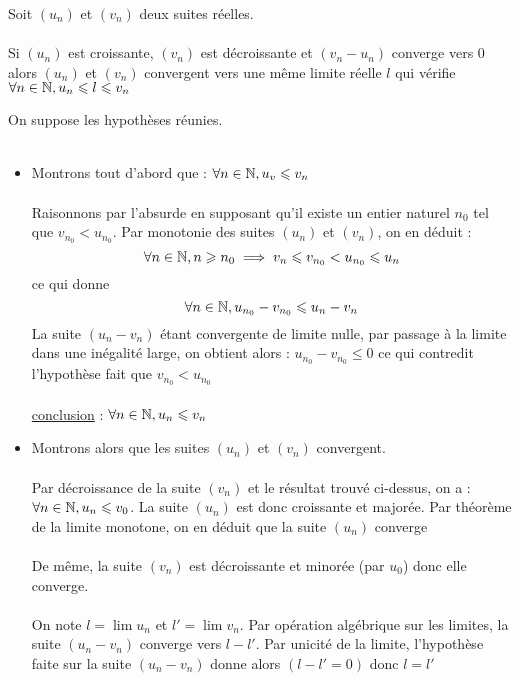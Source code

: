 \begin{theo}
    Soit \((u_n)\) et \((v_n)\) deux suites réelles.\\~\\
    Si \((u_n)\) est croissante, \((v_n)\) est décroissante et \((v_n -u_n)\) converge vers \(0\) alors \((u_n)\) et \((v_n)\) convergent vers une même limite réelle \(l\) qui vérifie \(\forall n \in \mathbb{N}, u_n \leqslant l \leqslant v_n\)
\end{theo}
\begin{dem}
    On suppose les hypothèses réunies.\\~\\
    \begin{itemize}
        \item Montrons tout d'abord que  : \(\forall n \in \mathbb{N}, u_v \leqslant v_n\)\\~\\
        Raisonnons par l'absurde en supposant qu'il existe un entier naturel \(n_0\) tel que \(v_{n_0} < u_{n_0}\). Par monotonie des suites \((u_n)\) et \((v_n)\), on en déduit : 
        \[\forall n \in \mathbb{N}, n \geqslant n_0 \implies v_n \leqslant v_{n_0} < u_{n_0}\leqslant u_n\]
        ce qui donne 
        \[\forall n \in \mathbb{N},u_{n_0}-v_{n_0}\leqslant u_n -v_n\]
        La suite \((u_n - v_n)\) étant convergente de limite nulle, par passage à la limite dans une inégalité large, on obtient alors : \(u_{n_0}-v_{n_0}\leq 0\) ce qui contredit l'hypothèse fait que \(v_{n_0}<u_{n_0}\)\\~\\
        \underline{conclusion} : \(\forall n \in \mathbb{N}, u_n \leqslant v_n\)
        \item Montrons alors que les suites \((u_n)\) et \((v_n)\) convergent.\\~\\
        Par décroissance de la suite \((v_n)\) et le résultat trouvé ci-dessus, on a  : \(\forall n \in \mathbb{N}, u_n \leqslant v_0\). La suite \((u_n)\) est donc croissante et majorée. Par théorème de la limite monotone, on en déduit que la suite \((u_n)\) converge\\~\\
        De même, la suite \((v_n)\) est décroissante et minorée (par \(u_0\)) donc elle converge. \\~\\
        On note \(l = \lim u_n\) et \(l' = \lim v_n\). Par opération algébrique sur les limites, la suite \((u_n - v_n)\) converge vers \(l-l'\). Par unicité de la limite, l'hypothèse faite sur la suite \((u_n - v_n)\) donne alors \((l-l' = 0)\) donc \(l = l'\)\\~\\

\end{itemize}
\end{dem}
